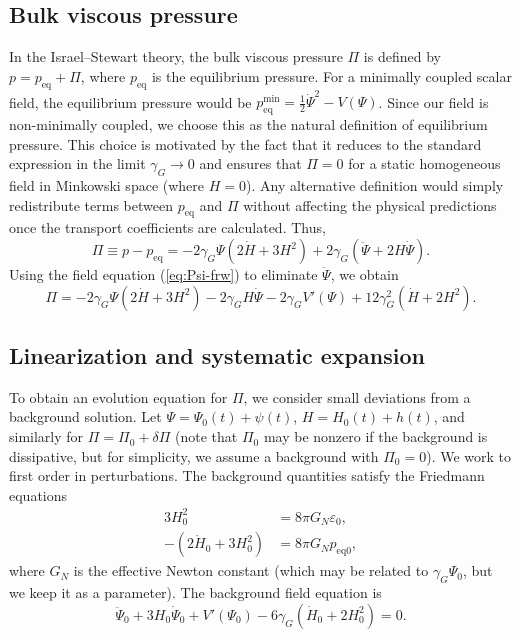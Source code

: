 \documentclass[aps,prd,reprint,superscriptaddress,floatfix]{revtex4-2}
\begin{document}
\subsection{Bulk viscous pressure}
\label{subsec:bulk}

In the Israel--Stewart theory, the bulk viscous pressure $\Pi$ is defined by $p = p_{\mathrm{eq}} + \Pi$, where $p_{\mathrm{eq}}$ is the equilibrium pressure. For a minimally coupled scalar field, the equilibrium pressure would be $p_{\mathrm{eq}}^{\mathrm{min}} = \frac12\dot\Psi^2 - V(\Psi)$. Since our field is non-minimally coupled, we choose this as the natural definition of equilibrium pressure. This choice is motivated by the fact that it reduces to the standard expression in the limit $\gamma_G\to0$ and ensures that $\Pi=0$ for a static homogeneous field in Minkowski space (where $H=0$). Any alternative definition would simply redistribute terms between $p_{\mathrm{eq}}$ and $\Pi$ without affecting the physical predictions once the transport coefficients are calculated. Thus,
\begin{equation}
\Pi \equiv p - p_{\mathrm{eq}} = - 2\gamma_G\Psi(2\dot H+3H^2) + 2\gamma_G(\ddot\Psi+2H\dot\Psi).
\label{eq:Pi-def}
\end{equation}
Using the field equation (\ref{eq:Psi-frw}) to eliminate $\ddot\Psi$, we obtain
\begin{equation}
\Pi = -2\gamma_G\Psi(2\dot H+3H^2) - 2\gamma_G H\dot\Psi - 2\gamma_G V'(\Psi) + 12\gamma_G^2(\dot H+2H^2).
\label{eq:Pi-expr}
\end{equation}

\subsection{Linearization and systematic expansion}
\label{subsec:linear}

To obtain an evolution equation for $\Pi$, we consider small deviations from a background solution. Let $\Psi = \Psi_0(t) + \psi(t)$, $H = H_0(t) + h(t)$, and similarly for $\Pi = \Pi_0 + \delta \Pi$ (note that $\Pi_0$ may be nonzero if the background is dissipative, but for simplicity, we assume a background with $\Pi_0=0$). We work to first order in perturbations. The background quantities satisfy the Friedmann equations
\begin{align}
3H_0^2 &= 8\pi G_N \varepsilon_0, \label{eq:F1}\\
-(2\dot H_0+3H_0^2) &= 8\pi G_N p_{\mathrm{eq}0}, \label{eq:F2}
\end{align}
where $G_N$ is the effective Newton constant (which may be related to $\gamma_G\Psi_0$, but we keep it as a parameter). The background field equation is
\begin{equation}
\ddot\Psi_0 + 3H_0\dot\Psi_0 + V'(\Psi_0) - 6\gamma_G(\dot H_0 + 2H_0^2) = 0.
\label{eq:bg-eom}
\end{equation}
\end{document}
